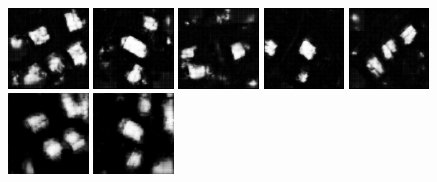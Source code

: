 \documentclass[12pt,a4paper]{article}
\begin{document}
    
    \begin{figure}[p]
        \centering

        \includegraphics[width=0.19\textwidth]{images/data_onlydida/predictions/535}
        \includegraphics[width=0.19\textwidth]{images/data_onlydida/predictions/537}
        \includegraphics[width=0.19\textwidth]{images/data_onlydida/predictions/539}
        \includegraphics[width=0.19\textwidth]{images/data_onlydida/predictions/551}
        \includegraphics[width=0.19\textwidth]{images/data_onlydida/predictions/553}
        \\[1px]
        \includegraphics[width=0.19\textwidth]{images/data_withjosm/predictions/535}
        \includegraphics[width=0.19\textwidth]{images/data_withjosm/predictions/537}

\end{figure}
\end{document}

